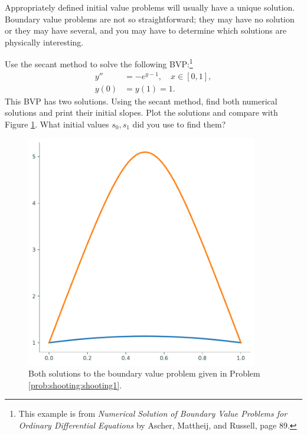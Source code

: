 
\begin{problem}
\label{prob:shooting:shooting1}
Appropriately defined initial value problems will usually have a unique solution.
Boundary value problems are not so straightforward; they may have no solution or they may have several, and you may have to determine which solutions are physically interesting.

Use the secant method to solve the following BVP:\footnote{This example is from \textit{Numerical Solution of Boundary Value Problems for Ordinary Differential Equations} by Ascher, Mattheij, and Russell, page 89.}
\begin{equation*}
\begin{split}
y'' &= -e^{y-1}, \quad x \in [0,1],\\
y(0) &=y(1) =1.
\end{split}
\end{equation*}
This BVP has two solutions.
Using the secant method, find both numerical solutions and print their initial slopes.
Plot the solutions and compare with Figure \ref{fig:shooting:shooting1}.
What initial values $s_0, s_1$ did you use to find them?
\end{problem}

\begin{figure}[H]
\includegraphics[height=4in]{figures/problem1.pdf}
\caption{Both solutions to the boundary value problem given in Problem \ref{prob:shooting:shooting1}.}
\label{fig:shooting:shooting1}
\end{figure}

